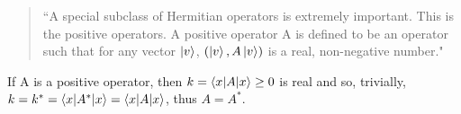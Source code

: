\documentclass[all.tex]{subfiles}
\begin{document}
\ignorespaces
\parindent 0pt
%
%
\begin{quote}
``A special subclass of Hermitian operators is extremely important. This is the
positive operators. A positive operator A is defined to be an operator such that
for any vector $\ket{v}$, $\left( \ket{v}, A \ket{v} \right)$ is a real,
non-negative number."
\end{quote}
\par If A is a positive operator, then $k = \braket{x|A|x} \ge 0$ is real and
so, trivially, $k = k^* = \braket{x|A^*|x} = \braket{x|A|x}$, thus $A = A^*$.
\end{document}
